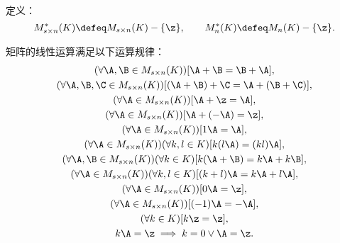 定义：\[
	M_{s \times n}^*(K) \defeq M_{s \times n}(K)-\{\z\},
	\qquad
	M_n^*(K) \defeq M_n(K)-\{\z\}.
\]

\begin{theorem}
矩阵的线性运算满足以下运算规律：
\begin{gather}
	(\forall\A,\B\in M_{s\times n}(K))[\A + \B = \B + \A], \\
	(\forall\A,\B,\C\in M_{s\times n}(K))[(\A + \B) + \C = \A + (\B + \C)], \\
	(\forall\A\in M_{s\times n}(K))[\A + \z = \A], \\
	(\forall\A\in M_{s\times n}(K))[\A + (-\A) = \z], \\
	(\forall\A\in M_{s\times n}(K))[1 \A = \A], \\
	(\forall\A\in M_{s\times n}(K))(\forall k,l\in K)[k(l \A) = (kl) \A], \\
	(\forall\A,\B\in M_{s\times n}(K))(\forall k\in K)[k(\A + \B) = k\A + k\B], \\
	(\forall\A\in M_{s\times n}(K))(\forall k,l\in K)[(k+l)\A = k\A + l\A], \\
	(\forall\A\in M_{s\times n}(K))[0\A = \z], \\
	(\forall\A\in M_{s\times n}(K))[(-1)\A = -\A], \\
	(\forall k\in K)[k\z = \z], \\
	k\A = \z \implies k = 0 \lor \A = \z.
\end{gather}
\end{theorem}
